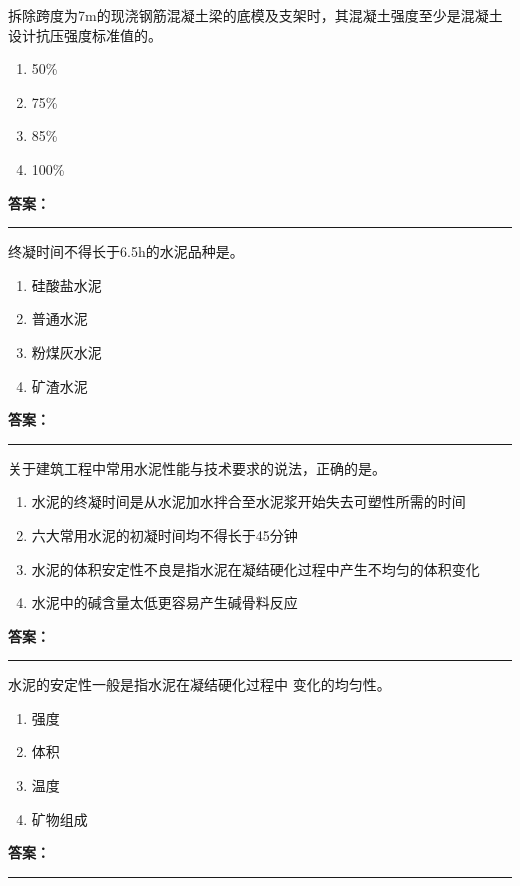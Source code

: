 \documentclass[UTF8,fontset=fandol,11pt]{ctexart}
\newcommand{\answerline}{\textcolor{answerred}{\rule{2.4cm}{0.7pt}}}
\begin{document}
\begin{quizbox}[title={第 41 题}]
拆除跨度为7m的现浇钢筋混凝土梁的底模及支架时，其混凝土强度至少是混凝土设计抗压强度标准值的。\\
\begin{enumerate}[label=\Alph*.]
\item 50\%
\item 75\%
\item 85\%
\item 100\%
\end{enumerate}
\textbf{\textcolor{answerred}{答案：}} \answerline
\end{quizbox}

\begin{quizbox}[title={第 42 题}]
终凝时间不得长于6.5h的水泥品种是。\\
\begin{enumerate}[label=\Alph*.]
\item 硅酸盐水泥
\item 普通水泥
\item 粉煤灰水泥
\item 矿渣水泥
\end{enumerate}
\textbf{\textcolor{answerred}{答案：}} \answerline
\end{quizbox}

\begin{quizbox}[title={第 43 题}]
关于建筑工程中常用水泥性能与技术要求的说法，正确的是。\\
\begin{enumerate}[label=\Alph*.]
\item 水泥的终凝时间是从水泥加水拌合至水泥浆开始失去可塑性所需的时间
\item 六大常用水泥的初凝时间均不得长于45分钟
\item 水泥的体积安定性不良是指水泥在凝结硬化过程中产生不均匀的体积变化
\item 水泥中的碱含量太低更容易产生碱骨料反应
\end{enumerate}
\textbf{\textcolor{answerred}{答案：}} \answerline
\end{quizbox}

\begin{quizbox}[title={第 44 题}]
水泥的安定性一般是指水泥在凝结硬化过程中 变化的均匀性。\\
\begin{enumerate}[label=\Alph*.]
\item 强度
\item 体积
\item 温度
\item 矿物组成
\end{enumerate}
\textbf{\textcolor{answerred}{答案：}} \answerline
\end{quizbox}
\end{document}
